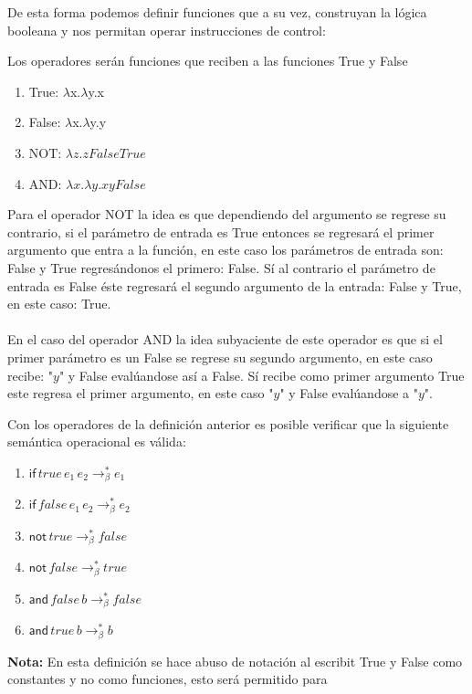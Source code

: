     De esta forma podemos definir funciones que a su vez, construyan la lógica booleana y nos permitan operar instrucciones de control:
    \begin{definition} Los operadores serán funciones que reciben a las funciones True y False\\
        \begin{enumerate}
            \item True: $\lambda$x.$\lambda$y.x 
            \item False:  $\lambda$x.$\lambda$y.y 
            \item NOT: $\lambda z. z  False True$ 
            \item AND:  $\lambda x.\lambda y. xy False$ 
        \end{enumerate} 
    \end{definition}

    Para el operador NOT la idea es que dependiendo del argumento se regrese su contrario, si el parámetro de entrada es True entonces se regresará el primer argumento que entra a la función, en este caso los parámetros de entrada son: False y True regresándonos el primero: False. Sí al contrario el parámetro de entrada es False éste regresará el segundo argumento de la entrada: False y True, en este caso: True.\\\\
    En el caso del operador AND la idea subyaciente de este operador es que si el primer parámetro es un False se regrese su segundo argumento, en este caso recibe: "$y$" y False evalúandose así a False. Sí recibe como primer argumento True este regresa el primer argumento, en este caso "$y$" y False evalúandose a "$y$".

    \begin{definition}
        Con los operadores de la definición anterior es posible verificar que la siguiente semántica operacional es válida:
        \begin{enumerate}
            \item $\mathsf{if}\,true\,e_1\,e_2 \to_\beta^* e_1$ 
            \item $\mathsf{if}\,false\,e_1\,e_2 \to_\beta^* e_2$ 
            \item $\mathsf{not}\,true\to_\beta^* false$
            \item $\mathsf{not}\,false\to_\beta^* true$
            \item $\mathsf{and}\,false\,b\to_\beta^* false$
            \item $\mathsf{and}\,true\,b\to_\beta^* b$
        \end{enumerate}
        \textbf{Nota:} En esta definición se hace abuso de notación al escribit True y  False como constantes y no como funciones, esto será permitido para 
     \end{definition}

